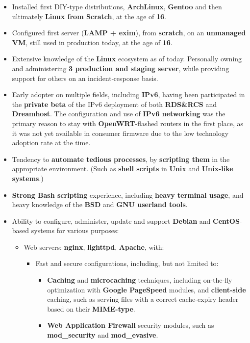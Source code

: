 \documentclass[11pt,a4paper]{article}
\begin{document}
\begin{itemize}
\begin{itemize}
		\item	Installed first DIY-type distributions, \textbf{ArchLinux}, \textbf{Gentoo} and then ultimately \textbf{Linux from Scratch}, at the age of \textbf{16}.
		\item	Configured first server (\textbf{LAMP + exim}), from \textbf{scratch}, on an \textbf{unmanaged VM}, still used in production today, at the age of \textbf{16}.
		\item	Extensive knowledge of the \textbf{Linux} ecosystem as of today. Personally owning and administering \textbf{3 production and staging server}, while providing support for others on an incident-response basis.
		\item	Early adopter on multiple fields, including \textbf{IPv6}, having been participated in the \textbf{private beta} of the IPv6 deployment of both \textbf{RDS\&RCS} and \textbf{Dreamhost}. The configuration and use of \textbf{IPv6 networking} was the primary reason to stay with \textbf{OpenWRT}-flashed routers in the first place, as it was not yet available in consumer firmware due to the low technology adoption rate at the time.
		\item	Tendency to \textbf{automate tedious processes}, by \textbf{scripting them} in the appropriate environment. (Such as \textbf{shell scripts} in \textbf{Unix} and \textbf{Unix-like systems}.)
		\item	\textbf{Strong Bash scripting} experience, including \textbf{heavy terminal usage}, and heavy knowledge of the \textbf{BSD} and \textbf{GNU userland tools}.
		\item	Ability to configure, administer, update and support \textbf{Debian} and \textbf{CentOS}-based systems for various purposes:
			\begin{itemize}
			\item	Web servers: \textbf{nginx}, \textbf{lighttpd}, \textbf{Apache}, with:
				\begin{itemize}
				\item	Fast and secure configurations, including, but not limited to:
					\begin{itemize}
					\item	\textbf{Caching} and \textbf{microcaching} techniques, including on-the-fly optimization with \textbf{Google PageSpeed} modules, and \textbf{client-side} caching, such as serving files with a correct cache-expiry header based on their \textbf{MIME-type}.
					\item	\textbf{Web Application Firewall} security modules, such as \textbf{mod\_security} and \textbf{mod\_evasive}.

\end{itemize}
\end{itemize}
\end{itemize}
\end{itemize}
\end{itemize}
\end{document}

